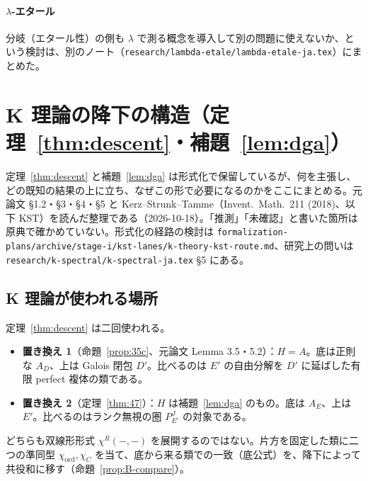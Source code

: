 \documentclass[11pt,a4paper]{ltjsarticle}
\numberwithin{equation}{section}
\theoremstyle{plain}
\theoremstyle{definition}
\theoremstyle{definition}
\newcommand{\ord}{\mathrm{ord}}
\begin{document}
\paragraph{$\lambda$-エタール}
分岐（エタール性）の側も $\lambda$ で測る概念を導入して別の問題に使えないか、という検討は、別のノート（\texttt{research/lambda-etale/lambda-etale-ja.tex}）にまとめた。

\section{K 理論の降下の構造（定理~\ref{thm:descent}・補題~\ref{lem:dga}）}\label{sec:descent}

定理~\ref{thm:descent} と補題~\ref{lem:dga} は形式化で保留しているが、何を主張し、どの既知の結果の上に立ち、なぜこの形で必要になるのかをここにまとめる。元論文 §1.2・§3・§4・§5 と Kerz--Strunk--Tamme（Invent.\ Math.\ 211 (2018)、以下 KST）を読んだ整理である（2026-10-18）。「推測」「未確認」と書いた箇所は原典で確かめていない。形式化の経路の検討は \texttt{formalization-plans/archive/stage-i/kst-lanes/k-theory-kst-route.md}、研究上の問いは \texttt{research/k-spectral/k-spectral-ja.tex} §5 にある。

\subsection{K 理論が使われる場所}
定理~\ref{thm:descent} は二回使われる。
\begin{itemize}
  \item \textbf{置き換え 1}（命題~\ref{prop:35c}、元論文 Lemma 3.5・5.2）：$H=A$。底は正則な $A_D$、上は Galois 閉包 $D'$。比べるのは $E'$ の自由分解を $D'$ に延ばした有限 perfect 複体の類である。
  \item \textbf{置き換え 2}（定理~\ref{thm:47}）：$H$ は補題~\ref{lem:dga} のもの。底は $A_E$、上は $E'$。比べるのはランク無視の圏 $P^J_{E'}$ の対象である。
\end{itemize}
どちらも双線形形式 $\chi^R(-,-)$ を展開するのではない。片方を固定した類に二つの準同型 $\chi_{\ord},\chi_C$ を当て、底から来る類での一致（底公式）を、降下によって共役和に移す（命題~\ref{prop:B-compare}）。
\end{document}
